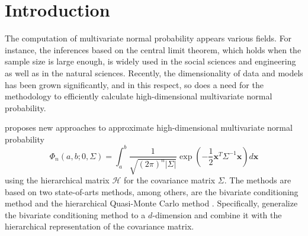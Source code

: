 \section{Introduction}

The computation of multivariate normal probability appears various fields. For instance, the inferences based on the central limit theorem, which holds when the sample size is large enough, is widely used in the social sciences and engineering as well as in the natural sciences. Recently, the dimensionality of data and models has been grown significantly, and in this respect, so does a need for the methodology to efficiently calculate high-dimensional multivariate normal probability.

\citet{cao2019hierarchical} proposes new approaches to approximate high-dimensional multivariate normal probability 
$$
\Phi_n(a, b; 0, \Sigma) = \int_a^b \frac{1}{\sqrt{(2\pi)^n |\Sigma|}} \exp\left( -\frac{1}{2} \mathbf{x}^T \Sigma^{-1} \mathbf{x} \right) d\mathbf{x}
$$
using the hierarchical matrix $\mathcal{H}$ \citep{hackbusch2015hierarchical} for the covariance matrix $\Sigma$. The methods are based on two state-of-arts methods, among others, are the bivariate conditioning method \citep{trinh2015bivariate} and the hierarchical Quasi-Monte Carlo method \citep{genton2018hierarchical}. Specifically, \citet{cao2019hierarchical} generalize the bivariate conditioning method to a $d$-dimension and combine it with the hierarchical representation of the covariance matrix. 


